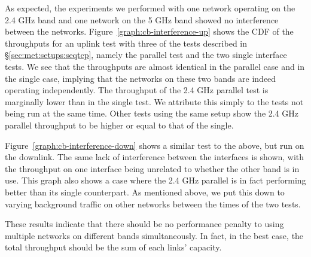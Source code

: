 As expected, the experiments we performed with one network operating on the 2.4
GHz band and one network on the 5 GHz band showed no interference between
the networks.  Figure~\ref{graph:cb-interference-up} shows the CDF of the
throughputs for an uplink test with three of the tests described in 
\S\ref{sec:met:setups:seqtcp}, namely the parallel test and the two single interface tests.
 We see that the throughputs are almost identical in the parallel case and in 
the single case, implying that the networks on these two bands are indeed 
operating independently. The throughput of the 2.4 GHz parallel test is 
marginally lower than in the single test. We attribute this simply to the tests 
not being run at the same time. Other tests using the same setup show the 2.4 
GHz parallel throughput to be higher or equal to that of the single.


Figure~\ref{graph:cb-interference-down} shows a similar test to the above, but
run on the downlink. The same lack of interference between the interfaces
is shown, with the throughput on one interface being unrelated to whether the
other band is in use. This graph also shows a case where the 2.4 GHz
parallel is in fact performing better than its single counterpart. As mentioned
above, we put this down to varying background traffic on other networks
between the times of the two tests.

These results indicate that there should be no performance penalty to using
multiple networks on different bands simultaneously. In fact, in the best case,
the total throughput should be the sum of each links' capacity.

